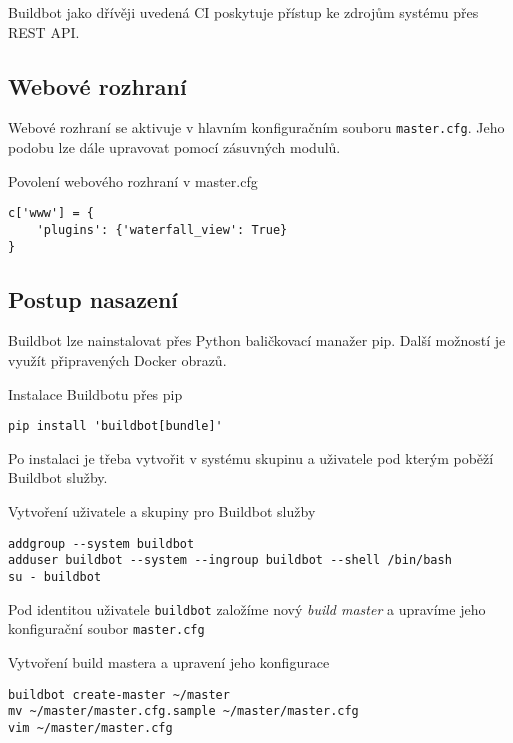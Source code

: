 Buildbot jako dřívěji uvedená CI poskytuje přístup ke zdrojům systému přes REST API.

\subsection{Webové rozhraní}

Webové rozhraní se aktivuje v hlavním konfiguračním souboru \verb|master.cfg|.
Jeho podobu lze dále upravovat pomocí zásuvných modulů.

\begin{listing}[ht]
\caption{\label{code:buildbot-enable-web}Povolení webového rozhraní v master.cfg}
\begin{verbatim}
c['www'] = {
    'plugins': {'waterfall_view': True}
}
\end{verbatim}
\end{listing}


\subsection{Postup nasazení}

Buildbot lze nainstalovat přes Python baličkovací manažer pip.
Další možností je využít připravených Docker obrazů.

\begin{listing}[ht]
\caption{Instalace Buildbotu přes pip}
\begin{verbatim}
pip install 'buildbot[bundle]'
\end{verbatim}
\end{listing}

Po instalaci je třeba vytvořit v systému skupinu a uživatele pod kterým poběží Buildbot služby.

\begin{listing}[ht]
\caption{Vytvoření uživatele a skupiny pro Buildbot služby}
\begin{verbatim}
addgroup --system buildbot
adduser buildbot --system --ingroup buildbot --shell /bin/bash
su - buildbot
\end{verbatim}
\end{listing}

Pod identitou uživatele \verb|buildbot| založíme nový \textit{build master} a upravíme jeho konfigurační soubor \verb|master.cfg|

\begin{listing}[ht]
\caption{Vytvoření build mastera a upravení jeho konfigurace}
\begin{verbatim}
buildbot create-master ~/master
mv ~/master/master.cfg.sample ~/master/master.cfg
vim ~/master/master.cfg
\end{verbatim}
\end{listing}

